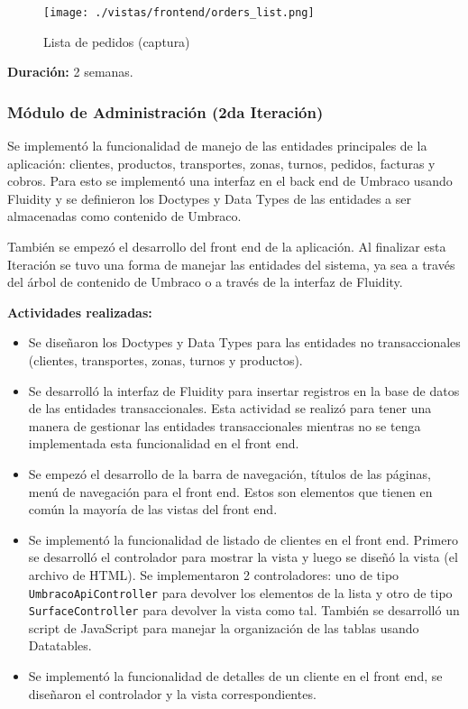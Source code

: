 \begin{figure}[H]
    \centering
    \texttt{[image: ./vistas/frontend/orders\_list.png]}
    \caption{Lista de pedidos (captura)}
    \label{fig:orderslist}
\end{figure}

\textbf{Duración:} 2 semanas.

\subsubsection{Módulo de Administración (2da Iteración)}
Se implementó la funcionalidad de manejo de las entidades principales de la aplicación: clientes, productos, transportes, zonas, turnos, pedidos, facturas y cobros. Para esto se implementó una interfaz en el back end de Umbraco usando Fluidity y se definieron los Doctypes y Data Types de las entidades a ser almacenadas como contenido de Umbraco.

También se empezó el desarrollo del front end de la aplicación. Al finalizar esta Iteración se tuvo una forma de manejar las entidades del sistema, ya sea a través del árbol de contenido de Umbraco o a través de la interfaz de Fluidity.

\vspace{0.3cm}
\textbf{Actividades realizadas:}
\begin{itemize}
    \item Se diseñaron los Doctypes y Data Types para las entidades no transaccionales (clientes, transportes, zonas, turnos y productos).
    \item Se desarrolló la interfaz de Fluidity para insertar registros en la base de datos de las entidades transaccionales. Esta actividad se realizó para tener una manera de gestionar las entidades transaccionales mientras no se tenga implementada esta funcionalidad en el front end.
    \item Se empezó el desarrollo de la barra de navegación, títulos de las páginas, menú de navegación para el front end. Estos son elementos que tienen en común la mayoría de las vistas del front end.
    \item Se implementó la funcionalidad de listado de clientes en el front end. Primero se desarrolló el controlador para mostrar la vista y luego se diseñó la vista (el archivo de HTML). Se implementaron 2 controladores: uno de tipo \verb|UmbracoApiController| para devolver los elementos de la lista y otro de tipo \verb|SurfaceController| para devolver la vista como tal. También se desarrolló un script de JavaScript para manejar la organización de las tablas usando Datatables.
    \item Se implementó la funcionalidad de detalles de un cliente en el front end, se diseñaron el controlador y la vista correspondientes.
\end{itemize}

